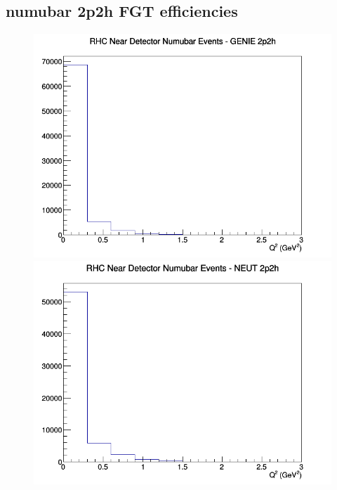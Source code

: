 \subsection{numubar 2p2h FGT efficiencies}
\begin{figure}[h]
\includegraphics[width=\linewidth]{eff_Q2/FGT/2p2h_RHC_ND_numubar_Q2_GENIE.png}
\endminipage
{}
\includegraphics[width=\linewidth]{eff_Q2/FGT/2p2h_RHC_ND_numubar_Q2_NEUT.png}
\endminipage
{}

\end{figure}
